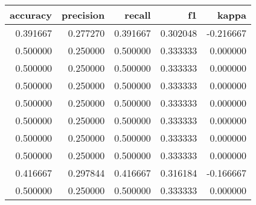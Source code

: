 \begin{tabular}{rrrrr}
\toprule
accuracy & precision & recall & f1 & kappa \\
\midrule
0.391667 & 0.277270 & 0.391667 & 0.302048 & -0.216667 \\
0.500000 & 0.250000 & 0.500000 & 0.333333 & 0.000000 \\
0.500000 & 0.250000 & 0.500000 & 0.333333 & 0.000000 \\
0.500000 & 0.250000 & 0.500000 & 0.333333 & 0.000000 \\
0.500000 & 0.250000 & 0.500000 & 0.333333 & 0.000000 \\
0.500000 & 0.250000 & 0.500000 & 0.333333 & 0.000000 \\
0.500000 & 0.250000 & 0.500000 & 0.333333 & 0.000000 \\
0.500000 & 0.250000 & 0.500000 & 0.333333 & 0.000000 \\
0.416667 & 0.297844 & 0.416667 & 0.316184 & -0.166667 \\
0.500000 & 0.250000 & 0.500000 & 0.333333 & 0.000000 \\
\bottomrule
\end{tabular}
